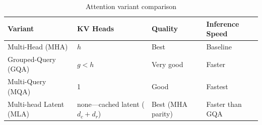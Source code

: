 \begin{table}[H]
\centering
\caption{Attention variant comparison}
\begin{tabularx}{\textwidth}{lXXX}
\toprule
\textbf{Variant} & \textbf{KV Heads} & \textbf{Quality} & \textbf{Inference Speed} \\
\midrule
Multi-Head (MHA) & $h$ & Best & Baseline \\
Grouped-Query (GQA) & $g < h$ & Very good & Faster \\
Multi-Query (MQA) & 1 & Good & Fastest \\
Multi-head Latent (MLA) & none---cached latent ($d_c + d_r$) & Best (MHA parity) & Faster than GQA \\
\bottomrule
\end{tabularx}
\end{table}

